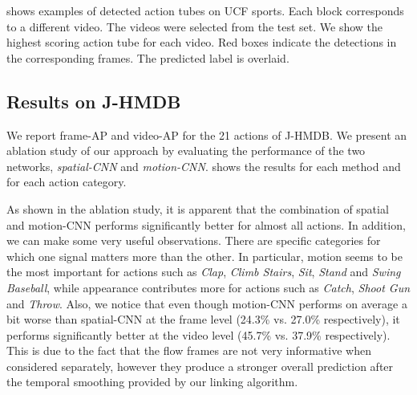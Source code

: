 \documentclass[10pt,twocolumn,letterpaper]{article}
\begin{document}
 shows examples of detected action tubes on UCF sports. Each block corresponds to a different video. The videos were selected from the test set. We show the highest scoring action tube for each video. Red boxes indicate the detections in the corresponding frames. The predicted label is overlaid.


\subsection{Results on J-HMDB}

We report frame-AP and video-AP for the 21 actions of J-HMDB. We present an ablation study of our approach by evaluating the performance of the two networks,  \textit{spatial-CNN} and \textit{motion-CNN}.  shows the results for each method and for each action category. 

As shown in the ablation study, it is apparent that the combination of spatial and motion-CNN performs significantly better for almost all actions. In addition, we can make some very useful observations. There are specific categories for which one signal matters more than the other. In particular, motion seems to be the most important for actions such as \textit{Clap}, \textit{Climb Stairs}, \textit{Sit}, \textit{Stand} and \textit{Swing Baseball}, while appearance contributes more for actions such as \textit{Catch}, \textit{Shoot Gun} and \textit{Throw}. Also, we notice that even though motion-CNN performs on average a bit worse than spatial-CNN at the frame level (24.3\% vs. 27.0\% respectively), it performs significantly better at the video level (45.7\% vs. 37.9\% respectively). This is due to the fact that the flow frames are not very informative when considered separately, however they produce a stronger overall prediction after the temporal smoothing provided by our linking algorithm.
\end{document}
